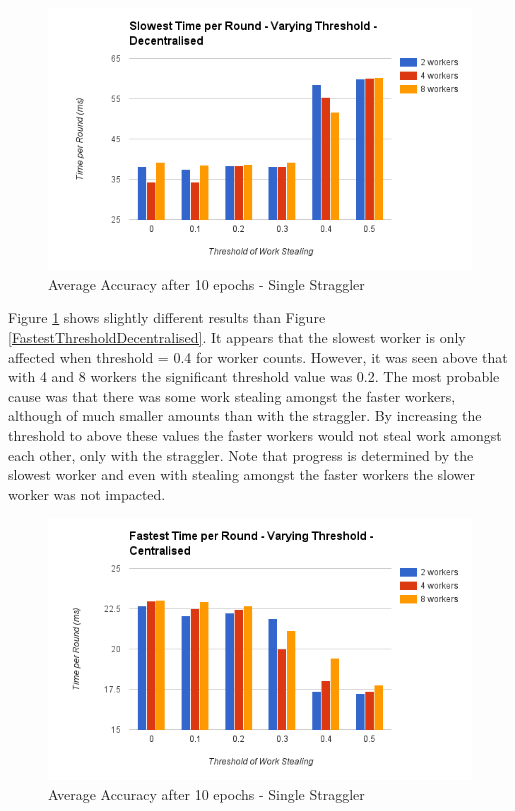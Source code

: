 \documentclass[12pt]{article}
\begin{document}
\begin{figure}[H]
  \centering
  \includegraphics[width=6in]{SlowestThresholdDecentralised}
  \caption[]{Average Accuracy after 10 epochs - Single Straggler}
  \label{SlowestThresholdDecentralised}
\end{figure}

Figure \ref{SlowestThresholdDecentralised} shows slightly different results than Figure \ref{FastestThresholdDecentralised}. It appears that the slowest worker is only affected when threshold = 0.4 for worker counts. However, it was seen above that with 4 and 8 workers the significant threshold value was 0.2. The most probable cause was that there was some work stealing amongst the faster workers, although of much smaller amounts than with the straggler. By increasing the threshold to above these values the faster workers would not steal work amongst each other, only with the straggler. Note that progress is determined by the slowest worker and even with stealing amongst the faster workers the slower worker was not impacted.

\begin{figure}[H]
  \centering
  \includegraphics[width=6in]{FastestThresholdCentralised}
  \caption[]{Average Accuracy after 10 epochs - Single Straggler}
  \label{FastestThresholdCentralised}
\end{figure}
\end{document}
